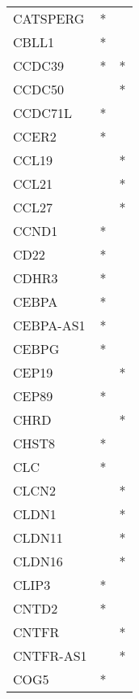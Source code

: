 \begin{longtable}{lcc}
CATSPERG         &              * &            \\
CBLL1            &              * &            \\
CCDC39           &              * &          * \\
CCDC50           &                &          * \\
CCDC71L          &              * &            \\
CCER2            &              * &            \\
CCL19            &                &          * \\
CCL21            &                &          * \\
CCL27            &                &          * \\
CCND1            &              * &            \\
CD22             &              * &            \\
CDHR3            &              * &            \\
CEBPA            &              * &            \\
CEBPA-AS1        &              * &            \\
CEBPG            &              * &            \\
CEP19            &                &          * \\
CEP89            &              * &            \\
CHRD             &                &          * \\
CHST8            &              * &            \\
CLC              &              * &            \\
CLCN2            &                &          * \\
CLDN1            &                &          * \\
CLDN11           &                &          * \\
CLDN16           &                &          * \\
CLIP3            &              * &            \\
CNTD2            &              * &            \\
CNTFR            &                &          * \\
CNTFR-AS1        &                &          * \\
COG5             &              * &            \\

\end{longtable}
